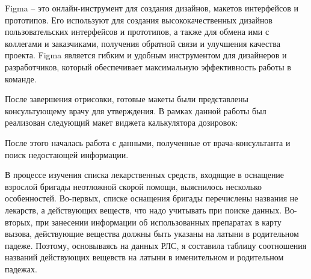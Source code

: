 Figma -- это онлайн-инструмент для создания дизайнов, макетов интерфейсов и прототипов. Его используют для создания высококачественных дизайнов пользовательских интерфейсов и прототипов, а также для обмена ими с коллегами и заказчиками, получения обратной связи и улучшения качества проекта. Figma является гибким и удобным инструментом для дизайнеров и разработчиков, который обеспечивает максимальную эффективность работы в команде.

После завершения отрисовки, готовые макеты были представлены консультующему врачу для утверждения. В рамках данной работы был реализован следующий макет виджета калькулятора дозировок:

После этого началась работа с данными, полученные от врача-консультанта и поиск недостающей информации.

В процессе изучения списка лекарственных средств, входящие в оснащение взрослой бригады неотложной скорой помощи, выяснилось несколько особенностей. Во-первых, списке оснащения бригады перечислены названия не лекарств, а действующих веществ, что надо учитывать при поиске данных. Во-вторых, при занесении информации об использованных препаратах в карту вызова, действующие вещества должны быть указаны на латыни в родительном падеже. Поэтому, основываясь на данных РЛС, я составила таблицу соотношения названий действующих вещевств на латыни в именительном и родительном падежах.

